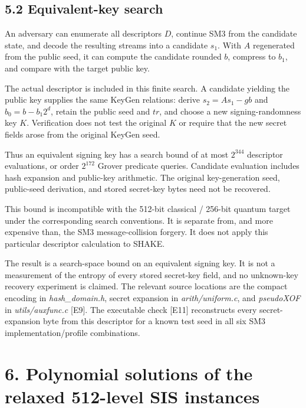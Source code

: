 \documentclass[
  american,
  10pt,
  a4paper,
]{article}
\begin{document}
\subsection{5.2 Equivalent-key search}\label{equivalent-key-search}

An adversary can enumerate all descriptors \(D\), continue SM3 from the
candidate state, and decode the resulting streams into a candidate
\(s_1\). With \(A\) regenerated from the public seed, it can compute the
candidate rounded \(b\), compress to \(b_1\), and compare with the
target public key.

The actual descriptor is included in this finite search. A candidate
yielding the public key supplies the same KeyGen relations: derive
\(s_2=As_1-gb\) and \(b_0=b-b_1 2^d\), retain the public seed and
\(tr\), and choose a new signing-randomness key \(K\). Verification does
not test the original \(K\) or require that the new secret fields arose
from the original KeyGen seed.

Thus an equivalent signing key has a search bound of at most \(2^{344}\)
descriptor evaluations, or order \(2^{172}\) Grover predicate queries.
Candidate evaluation includes hash expansion and public-key arithmetic.
The original key-generation seed, public-seed derivation, and stored
secret-key bytes need not be recovered.

This bound is incompatible with the 512-bit classical / 256-bit quantum
target under the corresponding search conventions. It is separate from,
and more expensive than, the SM3 message-collision forgery. It does not
apply this particular descriptor calculation to SHAKE.

The result is a search-space bound on an equivalent signing key. It is
not a measurement of the entropy of every stored secret-key field, and
no unknown-key recovery experiment is claimed. The relevant source
locations are the compact encoding in \emph{hash\_domain.h}, secret
expansion in \emph{arith/uniform.c}, and \emph{pseudoXOF} in
\emph{utils/auxfunc.c} {[}E9{]}. The executable check {[}E11{]}
reconstructs every secret-expansion byte from this descriptor for a
known test seed in all six SM3 implementation/profile combinations.

\section{6. Polynomial solutions of the relaxed 512-level SIS
instances}\label{polynomial-solutions-of-the-relaxed-512-level-sis-instances}
\end{document}

